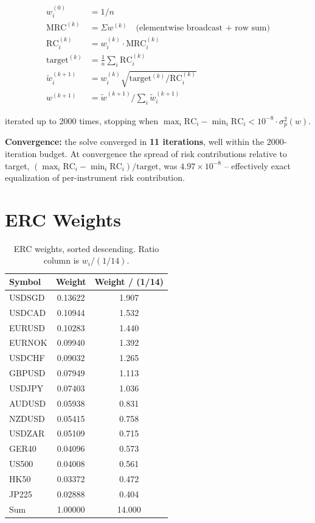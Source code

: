 \documentclass[11pt]{article}
\begin{document}
\begin{align*}
  w^{(0)}_i &= 1/n \\
  \mathrm{MRC}^{(k)} &= \Sigma w^{(k)} \quad \text{(elementwise broadcast + row sum)} \\
  \mathrm{RC}^{(k)}_i &= w^{(k)}_i \cdot \mathrm{MRC}^{(k)}_i \\
  \mathrm{target}^{(k)} &= \frac{1}{n}\sum_i \mathrm{RC}^{(k)}_i \\
  \tilde{w}^{(k+1)}_i &= w^{(k)}_i \sqrt{\mathrm{target}^{(k)} / \mathrm{RC}^{(k)}_i} \\
  w^{(k+1)} &= \tilde{w}^{(k+1)} / \sum_i \tilde{w}^{(k+1)}_i
\end{align*}

iterated up to 2000 times, stopping when $\max_i \mathrm{RC}_i - \min_i \mathrm{RC}_i <
10^{-8} \cdot \sigma_p^2(w)$.

\textbf{Convergence:} the solve converged in \textbf{11 iterations}, well within the
2000-iteration budget. At convergence the spread of risk contributions relative to
target, $(\max_i \mathrm{RC}_i - \min_i \mathrm{RC}_i) / \mathrm{target}$, was
$4.97 \times 10^{-8}$ -- effectively exact equalization of per-instrument risk
contribution.

\section{ERC Weights}

\begin{table}[h]
\centering
\caption{ERC weights, sorted descending. Ratio column is $w_i / (1/14)$.}
\begin{tabular}{lS[table-format=1.5]S[table-format=1.3]}
\toprule
Symbol & {Weight} & {Weight / (1/14)} \\
\midrule
USDSGD & 0.13622 & 1.907 \\
USDCAD & 0.10944 & 1.532 \\
EURUSD & 0.10283 & 1.440 \\
EURNOK & 0.09940 & 1.392 \\
USDCHF & 0.09032 & 1.265 \\
GBPUSD & 0.07949 & 1.113 \\
USDJPY & 0.07403 & 1.036 \\
AUDUSD & 0.05938 & 0.831 \\
NZDUSD & 0.05415 & 0.758 \\
USDZAR & 0.05109 & 0.715 \\
GER40  & 0.04096 & 0.573 \\
US500  & 0.04008 & 0.561 \\
HK50   & 0.03372 & 0.472 \\
JP225  & 0.02888 & 0.404 \\
\midrule
Sum & 1.00000 & 14.000 \\
\bottomrule
\end{tabular}
\end{table}
\end{document}
